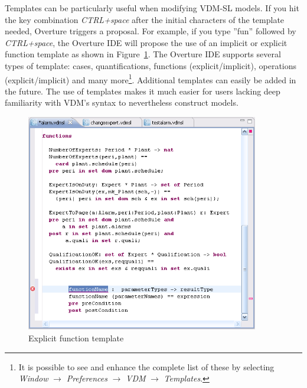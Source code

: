 Templates can be particularly useful when modifying VDM-SL models. If you hit the key combination \textit{CTRL+space} after the initial characters of the template needed, Overture triggers a proposal. For example, if you type ''fun'' followed by \textit{CTRL+space}, the Overture IDE will propose the use of an implicit or explicit function template as shown in Figure~\ref{fig:functionTemplate}. The Overture IDE supports several types of template: cases, quantifications, functions (explicit/implicit), operations (explicit/implicit) and many more\footnote{It is possible to see and enhance the complete list of these by selecting \emph{Window} $\rightarrow$ \emph{Preferences} $\rightarrow$ \emph{VDM}  $\rightarrow$ \emph{Templates}.}. Additional templates can easily be added in the future. The use of templates makes it much easier for users lacking deep familiarity with VDM's syntax to nevertheless construct models.
%
\begin{figure}[!htb]
\begin{center}
\includegraphics[width=4in]{figures/FunctionTemplate}
\caption{Explicit function template}
\label{fig:functionTemplate}
\end{center}
\end{figure}

